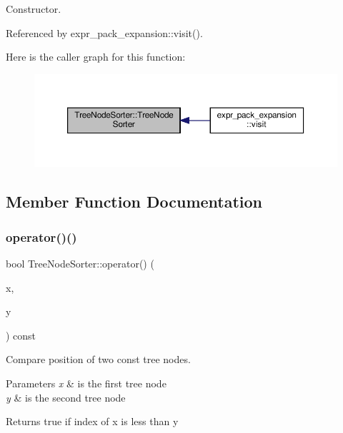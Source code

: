 Constructor. 



Referenced by expr\+\_\+pack\+\_\+expansion\+::visit().

Here is the caller graph for this function\+:
\nopagebreak
\begin{figure}[H]
\begin{center}
\leavevmode
\includegraphics[width=350pt]{d6/d1f/classTreeNodeSorter_a98fb85a9c57c196f91626b395cb63748_icgraph}
\end{center}
\end{figure}


\subsection{Member Function Documentation}
\mbox{\label{classTreeNodeSorter_acf8467e107543d4a8a108e15bc8aec33}} 
\subsubsection{\texorpdfstring{operator()()}{operator()()}}
{\footnotesize\ttfamily bool Tree\+Node\+Sorter\+::operator() (\begin{DoxyParamCaption}\item[{const \hyperlink{tree__node_8hpp_a6ee377554d1c4871ad66a337eaa67fd5}{tree\+\_\+node\+Ref} \&}]{x,  }\item[{const \hyperlink{tree__node_8hpp_a6ee377554d1c4871ad66a337eaa67fd5}{tree\+\_\+node\+Ref} \&}]{y }\end{DoxyParamCaption}) const}



Compare position of two const tree nodes. 


\begin{DoxyParams}{Parameters}
{\em x} & is the first tree node \\
\hline
{\em y} & is the second tree node \\
\hline
\end{DoxyParams}
\begin{DoxyReturn}{Returns}
true if index of x is less than y 
\end{DoxyReturn}


